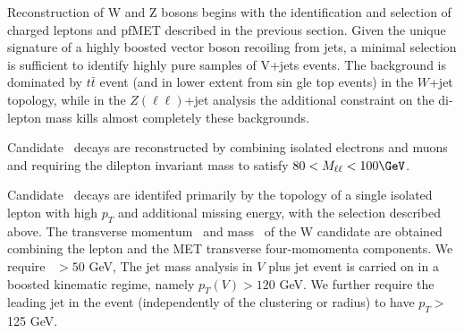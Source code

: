 Reconstruction of W and Z bosons begins with the identification
and selection of charged leptons and pfMET described in the previous 
section.  Given the unique signature of a highly boosted vector 
boson recoiling from jets, a minimal selection is sufficient to 
identify highly pure samples of V+jets events. The background is dominated by $t\bar{t}$ event (and in lower extent from sin
gle top events) in the $W$+jet topology, while in the $Z(\ell\ell)$+jet analysis the additional constraint on the di-lepton 
mass kills almost completely these backgrounds.  

Candidate \ZtoLL\ decays are reconstructed by combining 
isolated electrons and muons and requiring the dilepton invariant 
mass to satisfy $80<M_{\ell\ell}<100\GeV$.  

Candidate \WtoLN\ decays are identifed primarily by the topology
of a single isolated lepton with high $p_T$ and additional missing energy, with the selection described above.  The
transverse momentum \ptW\ and mass \mtW\ of the W candidate are obtained combining the lepton and the MET transverse four-momomenta components. We require \mtW\ $>50$ GeV,  
The jet mass analysis in $V$ plus jet event is carried on in a boosted kinematic regime, namely $p_T (V)> 120$ GeV. We further require the leading jet in the event (independently of the clustering or radius) to have $p_T>$ 125 GeV.




